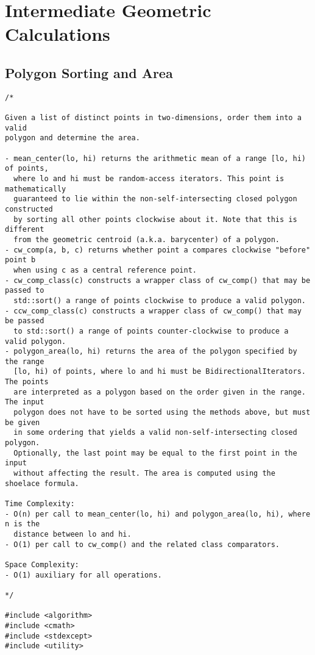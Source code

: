 \section{Intermediate Geometric Calculations}
\setcounter{section}{3}
\setcounter{subsection}{0}
\subsection{Polygon Sorting and Area}
\begin{lstlisting}
/*

Given a list of distinct points in two-dimensions, order them into a valid
polygon and determine the area.

- mean_center(lo, hi) returns the arithmetic mean of a range [lo, hi) of points,
  where lo and hi must be random-access iterators. This point is mathematically
  guaranteed to lie within the non-self-intersecting closed polygon constructed
  by sorting all other points clockwise about it. Note that this is different
  from the geometric centroid (a.k.a. barycenter) of a polygon.
- cw_comp(a, b, c) returns whether point a compares clockwise "before" point b
  when using c as a central reference point.
- cw_comp_class(c) constructs a wrapper class of cw_comp() that may be passed to
  std::sort() a range of points clockwise to produce a valid polygon.
- ccw_comp_class(c) constructs a wrapper class of cw_comp() that may be passed
  to std::sort() a range of points counter-clockwise to produce a valid polygon.
- polygon_area(lo, hi) returns the area of the polygon specified by the range
  [lo, hi) of points, where lo and hi must be BidirectionalIterators. The points
  are interpreted as a polygon based on the order given in the range. The input
  polygon does not have to be sorted using the methods above, but must be given
  in some ordering that yields a valid non-self-intersecting closed polygon.
  Optionally, the last point may be equal to the first point in the input
  without affecting the result. The area is computed using the shoelace formula.

Time Complexity:
- O(n) per call to mean_center(lo, hi) and polygon_area(lo, hi), where n is the
  distance between lo and hi.
- O(1) per call to cw_comp() and the related class comparators.

Space Complexity:
- O(1) auxiliary for all operations.

*/

#include <algorithm>
#include <cmath>
#include <stdexcept>
#include <utility>


\end{lstlisting}

